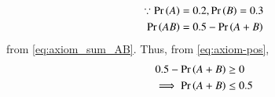 \begin{align}
	\because \Pr\left(A\right)&=0.2,
\Pr\left(B\right)=0.3
\\
\Pr\left(AB\right)&= 0.5-\Pr\left(A+B\right)
\end{align}
from \eqref{eq:axiom_sum_AB}.  Thus, from 
	\eqref{eq:axiom-pos},
\begin{align}
	0.5-\Pr\left(A+B\right)&\ge 0\\
\implies\Pr\left(A+B\right) &\le 0.5
\end{align}

